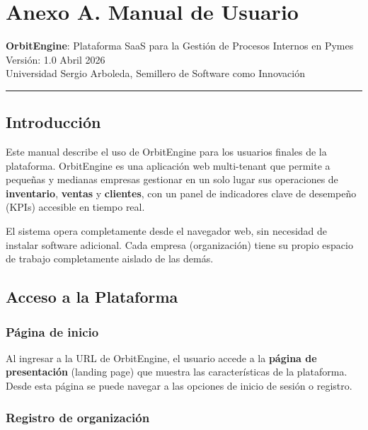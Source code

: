 \chapter{Anexo A. Manual de Usuario}\label{anexo-a.-manual-de-usuario}

\textbf{OrbitEngine}: Plataforma SaaS para la Gestión de Procesos Internos en Pymes\\
Versión: 1.0 \textbar{} Abril 2026\\
Universidad Sergio Arboleda, Semillero de Software como Innovación

\begin{center}\rule{0.5\linewidth}{0.5pt}\end{center}

\section{Introducción}\label{introducciuxf3n}

Este manual describe el uso de OrbitEngine para los usuarios finales de la plataforma. OrbitEngine es una aplicación web multi-tenant que permite a pequeñas y medianas empresas gestionar en un solo lugar sus operaciones de \textbf{inventario}, \textbf{ventas} y \textbf{clientes}, con un panel de indicadores clave de desempeño (KPIs) accesible en tiempo real.

El sistema opera completamente desde el navegador web, sin necesidad de instalar software adicional. Cada empresa (organización) tiene su propio espacio de trabajo completamente aislado de las demás.

\section{Acceso a la Plataforma}\label{acceso-a-la-plataforma}

\subsection{Página de inicio}\label{puxe1gina-de-inicio}

Al ingresar a la URL de OrbitEngine, el usuario accede a la \textbf{página de presentación} (landing page) que muestra las características de la plataforma. Desde esta página se puede navegar a las opciones de inicio de sesión o registro.

\subsection{Registro de organización}\label{registro-de-organizaciuxf3n}

